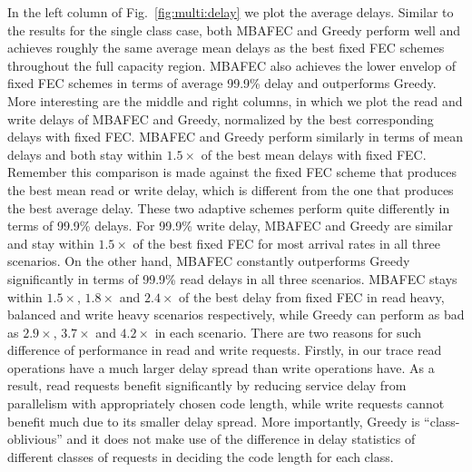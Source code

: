 \documentclass[journal]{IEEEtran}
\newcommand{\multiclass}{{MBAFEC}\xspace}
\begin{document}
In the left column of Fig.~\ref{fig:multi:delay} we plot the average delays. Similar to the results for the single class case, both \multiclass and Greedy perform well and achieves roughly the same average mean delays as the best fixed FEC schemes throughout the full capacity region. \multiclass also achieves the lower envelop of fixed FEC schemes in terms of  average 99.9\% delay and outperforms Greedy. More interesting are the middle and right columns, in which we plot the read and write delays of \multiclass and Greedy, normalized by the best corresponding delays with fixed FEC. \multiclass and Greedy perform similarly in terms of mean delays and both stay within $1.5\times$ of the best mean delays with fixed FEC. Remember this comparison is made against the fixed FEC scheme that produces the best mean read or write delay, which is different from the one that produces the best average delay.
These two adaptive schemes perform quite differently in terms of 99.9\% delays. For 99.9\% write delay, \multiclass and Greedy are similar and stay within $1.5\times$ of the best fixed FEC for most arrival rates in all three scenarios. On the other hand, \multiclass constantly outperforms Greedy significantly in terms of 99.9\% read delays in all three scenarios. \multiclass stays within $1.5\times$, $1.8\times$ and $2.4\times$ of the best delay from fixed FEC in read heavy,  balanced and write heavy scenarios respectively, while Greedy can perform as bad as $2.9\times$, $3.7\times$ and $4.2\times$ in each scenario.   
There are two reasons for such difference of performance in read and write requests. Firstly, in our trace read operations have a much larger delay spread than write operations have. As a result, read requests benefit significantly by reducing service delay from parallelism with appropriately chosen code length, while write requests cannot benefit much due to its smaller delay spread. More importantly, Greedy is ``class-oblivious'' and it does not make use of the difference in delay statistics of different classes of requests in deciding the code length for each class. 
\end{document}
